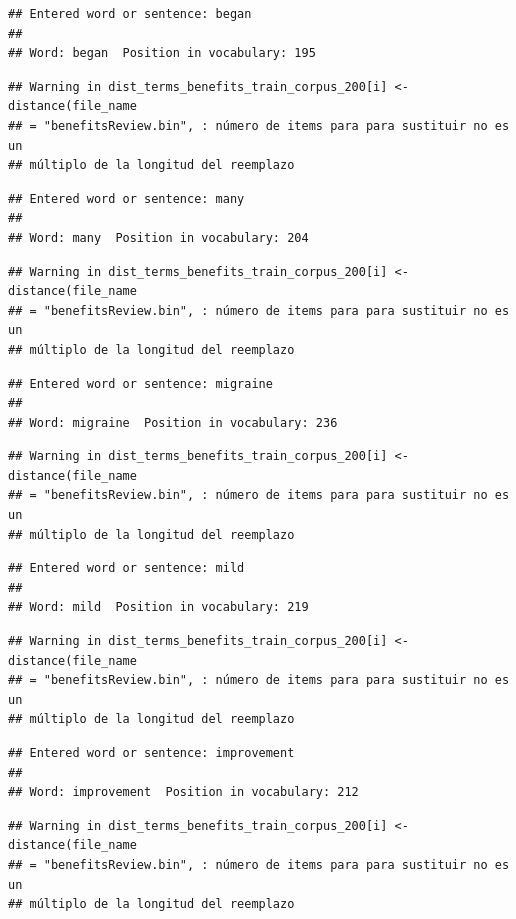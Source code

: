 \documentclass[spanish,]{article}
\begin{document}
\begin{verbatim}
## Entered word or sentence: began
## 
## Word: began  Position in vocabulary: 195
\end{verbatim}

\begin{verbatim}
## Warning in dist_terms_benefits_train_corpus_200[i] <- distance(file_name
## = "benefitsReview.bin", : número de items para para sustituir no es un
## múltiplo de la longitud del reemplazo
\end{verbatim}

\begin{verbatim}
## Entered word or sentence: many
## 
## Word: many  Position in vocabulary: 204
\end{verbatim}

\begin{verbatim}
## Warning in dist_terms_benefits_train_corpus_200[i] <- distance(file_name
## = "benefitsReview.bin", : número de items para para sustituir no es un
## múltiplo de la longitud del reemplazo
\end{verbatim}

\begin{verbatim}
## Entered word or sentence: migraine
## 
## Word: migraine  Position in vocabulary: 236
\end{verbatim}

\begin{verbatim}
## Warning in dist_terms_benefits_train_corpus_200[i] <- distance(file_name
## = "benefitsReview.bin", : número de items para para sustituir no es un
## múltiplo de la longitud del reemplazo
\end{verbatim}

\begin{verbatim}
## Entered word or sentence: mild
## 
## Word: mild  Position in vocabulary: 219
\end{verbatim}

\begin{verbatim}
## Warning in dist_terms_benefits_train_corpus_200[i] <- distance(file_name
## = "benefitsReview.bin", : número de items para para sustituir no es un
## múltiplo de la longitud del reemplazo
\end{verbatim}

\begin{verbatim}
## Entered word or sentence: improvement
## 
## Word: improvement  Position in vocabulary: 212
\end{verbatim}

\begin{verbatim}
## Warning in dist_terms_benefits_train_corpus_200[i] <- distance(file_name
## = "benefitsReview.bin", : número de items para para sustituir no es un
## múltiplo de la longitud del reemplazo
\end{verbatim}
\end{document}
